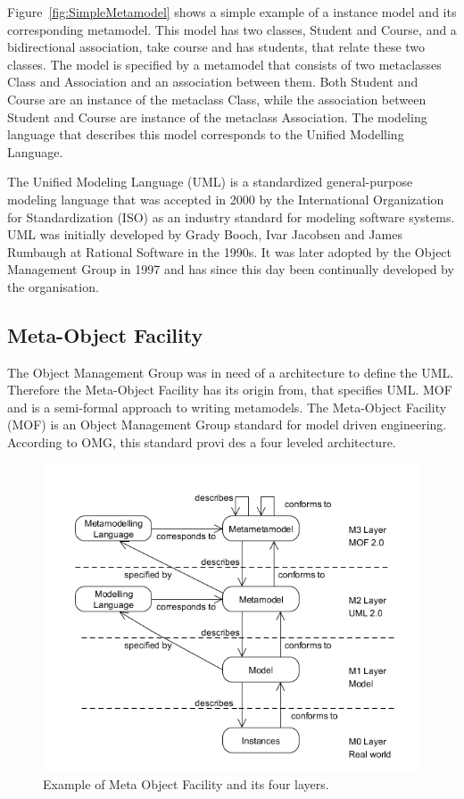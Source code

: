Figure~\ref{fig:SimpleMetamodel} shows a simple example of a instance model and
its corresponding metamodel. This model has two classes, Student and Course, and
a bidirectional association, take course and has students, that relate
these two classes. The model is specified by a metamodel that consists of two
metaclasses Class and Association and an association between them. Both Student
and Course are an instance of the metaclass Class, while the association
between Student and Course are instance of the metaclass Association. The
modeling language that describes this model corresponds to the Unified Modelling
Language.

The Unified Modeling Language\cite{UML,UML_SPEC} (UML) is a standardized
general-purpose modeling language that was accepted in 2000 by the International
Organization for Standardization (ISO) as an industry standard for modeling
software systems. UML was initially developed by Grady Booch, Ivar Jacobsen and
James Rumbaugh at Rational Software in the 1990s. It was later adopted by the
Object Management Group in 1997 and has since this day been continually
developed by the organisation. 

\subsection{Meta-Object Facility}

The Object Management Group was in need of a architecture to define the
UML. Therefore the Meta-Object Facility has its origin from, that specifies UML.
MOF and is a semi-formal approach to writing metamodels. The Meta-Object
Facility\cite{MOF} (MOF) is an Object Management Group standard for model
driven engineering. According to OMG, this standard provi des a four leveled
architecture.

\begin{figure}[H]
	\centering
	\includegraphics[scale=0.6]{./Figures/MOFLayers.png}
	\caption[Meta Object Facility]
	{Example of Meta Object Facility and its four layers.}
	\label{fig:MOFLayers}
\end{figure}

